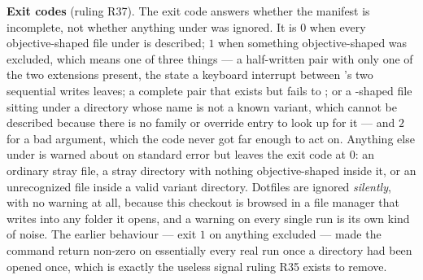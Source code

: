 \textbf{Exit codes} (ruling R37). The exit code answers whether the manifest is
incomplete, not whether anything under  was ignored. It is $0$ when every
objective-shaped file under  is described; $1$ when something
objective-shaped was excluded, which means one of three things --- a half-written
pair with only one of the two extensions present, the state a keyboard interrupt
between 's two sequential writes leaves; a complete pair that
exists but fails to ; or a -shaped file
sitting under a directory whose name is not a known variant, which cannot be
described because there is no family or override entry to look up for it --- and
$2$ for a bad argument, which the code never got far enough to act on. Anything
else under  is warned about on standard error but leaves the exit
code at $0$: an ordinary stray file, a stray directory with nothing
objective-shaped inside it, or an unrecognized file inside a valid variant
directory. Dotfiles are ignored \emph{silently}, with no warning at all, because
this checkout is browsed in a file manager that writes  into
any folder it opens, and a warning on every single run is its own kind of noise.
The earlier behaviour --- exit $1$ on anything excluded --- made the command
return non-zero on essentially every real run once a directory had been opened
once, which is exactly the useless signal ruling R35 exists to remove.

